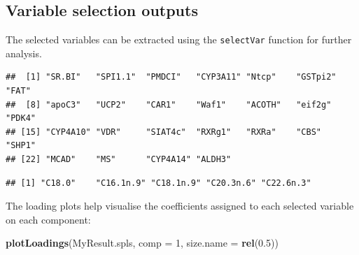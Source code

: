 \documentclass[]{book}
\newenvironment{Shaded}{\begin{snugshade}}{\end{snugshade}}
\newcommand{\CommentTok}[1]{\textcolor[rgb]{0.56,0.35,0.01}{\textit{#1}}}
\newcommand{\DataTypeTok}[1]{\textcolor[rgb]{0.13,0.29,0.53}{#1}}
\newcommand{\DecValTok}[1]{\textcolor[rgb]{0.00,0.00,0.81}{#1}}
\newcommand{\FloatTok}[1]{\textcolor[rgb]{0.00,0.00,0.81}{#1}}
\newcommand{\KeywordTok}[1]{\textcolor[rgb]{0.13,0.29,0.53}{\textbf{#1}}}
\newcommand{\NormalTok}[1]{#1}
\newcommand{\OperatorTok}[1]{\textcolor[rgb]{0.81,0.36,0.00}{\textbf{#1}}}
\newcommand{\StringTok}[1]{\textcolor[rgb]{0.31,0.60,0.02}{#1}}
\begin{document}
\hypertarget{variable-selection-outputs-1}{%
\subsection{Variable selection outputs}\label{variable-selection-outputs-1}}

The selected variables can be extracted using the \texttt{selectVar} function for further analysis.

\begin{Shaded}
\end{Shaded}

\begin{verbatim}
##  [1] "SR.BI"   "SPI1.1"  "PMDCI"   "CYP3A11" "Ntcp"    "GSTpi2"  "FAT"    
##  [8] "apoC3"   "UCP2"    "CAR1"    "Waf1"    "ACOTH"   "eif2g"   "PDK4"   
## [15] "CYP4A10" "VDR"     "SIAT4c"  "RXRg1"   "RXRa"    "CBS"     "SHP1"   
## [22] "MCAD"    "MS"      "CYP4A14" "ALDH3"
\end{verbatim}

\begin{Shaded}
\end{Shaded}

\begin{verbatim}
## [1] "C18.0"    "C16.1n.9" "C18.1n.9" "C20.3n.6" "C22.6n.3"
\end{verbatim}

The loading plots help visualise the coefficients assigned to each selected variable on each component:

\begin{Shaded}
\begin{Highlighting}[]
\KeywordTok{plotLoadings}\NormalTok{(MyResult.spls, }\DataTypeTok{comp =} \DecValTok{1}\NormalTok{, }\DataTypeTok{size.name =} \KeywordTok{rel}\NormalTok{(}\FloatTok{0.5}\NormalTok{))}
\end{Highlighting}
\end{Shaded}
\end{document}
